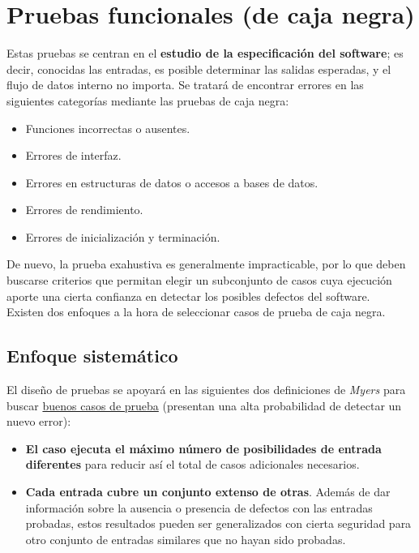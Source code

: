 \section{Pruebas funcionales (de caja negra)}

Estas pruebas se centran en el \textbf{estudio de la especificación del software}; es decir, conocidas las entradas, es posible determinar las salidas esperadas, y el flujo de datos interno no importa. Se tratará de encontrar errores en las siguientes categorías mediante las pruebas de caja negra:

\begin{itemize}
    \item Funciones incorrectas o ausentes.
    \item Errores de interfaz.
    \item Errores en estructuras de datos o accesos a bases de datos.
    \item Errores de rendimiento.
    \item Errores de inicialización y terminación.
\end{itemize}

De nuevo, la prueba exahustiva es generalmente impracticable, por lo que deben buscarse criterios que permitan elegir un subconjunto de casos cuya ejecución aporte una cierta confianza en detectar los posibles defectos del software.\\

Existen dos enfoques a la hora de seleccionar casos de prueba de caja negra.

\subsection{Enfoque sistemático}

El diseño de pruebas se apoyará en las siguientes dos definiciones de \textit{Myers} para buscar \uline{buenos casos de prueba} (presentan una alta probabilidad de detectar un nuevo error):

\begin{itemize}
    \item \textbf{El caso ejecuta el máximo número de posibilidades de entrada diferentes} para reducir así el total de casos adicionales necesarios.
    \item \textbf{Cada entrada cubre un conjunto extenso de otras}. Además de dar información sobre la ausencia o presencia de defectos con las entradas probadas, estos resultados pueden ser generalizados con cierta seguridad para otro conjunto de entradas similares que no hayan sido probadas.
\end{itemize}

